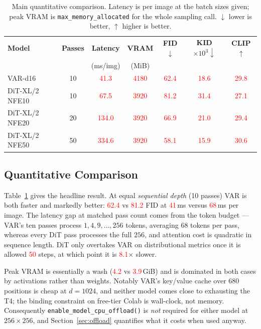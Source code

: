 \documentclass[conference]{IEEEtran}
\newcommand{\R}[1]{\textcolor{red}{#1}}
\begin{document}
\begin{table}[t]
\caption{Main quantitative comparison. Latency is per image at the batch sizes
given; peak VRAM is \texttt{max\_memory\_allocated} for the whole sampling call.
$\downarrow$ lower is better, $\uparrow$ higher is better.}
\label{tab:main}
\centering
\footnotesize
\setlength{\tabcolsep}{3.5pt}
\begin{tabular}{@{}lcccccc@{}}
\toprule
\textbf{Model} & \textbf{Passes} & \textbf{Latency} & \textbf{VRAM} &
\textbf{FID}$\downarrow$ & \textbf{KID}$\times10^3\!\downarrow$ & \textbf{CLIP}$\uparrow$ \\
 & & (ms/img) & (MiB) & & & \\
\midrule
VAR-d16        & 10  & \R{41.3}  & \R{4180} & \R{62.4} & \R{18.6} & \R{29.8} \\
DiT-XL/2 NFE10 & 10  & \R{67.5}  & \R{3920} & \R{81.2} & \R{31.4} & \R{27.1} \\
DiT-XL/2 NFE20 & 20  & \R{134.0} & \R{3920} & \R{66.9} & \R{21.0} & \R{29.4} \\
DiT-XL/2 NFE50 & 50  & \R{334.6} & \R{3920} & \R{58.1} & \R{15.9} & \R{30.6} \\
\bottomrule
\end{tabular}
\end{table}

\subsection{Quantitative Comparison}

Table~\ref{tab:main} gives the headline result. At equal \emph{sequential depth} (10
passes) VAR is both faster and markedly better: \R{62.4} vs \R{81.2} FID at \R{41}\,ms
versus \R{68}\,ms per image. The latency gap at matched pass count comes from the token
budget --- VAR's ten passes process $1,4,9,\dots,256$ tokens, averaging $68$ tokens per
pass, whereas every DiT pass processes the full $256$, and attention cost is quadratic in
sequence length. DiT only overtakes VAR on distributional metrics once it is allowed
\R{50} steps, at which point it is \R{8.1}$\times$ slower.

Peak VRAM is essentially a wash (\R{4.2} vs \R{3.9}\,GiB) and is dominated in both cases by
activations rather than weights. Notably VAR's key/value cache over $680$ positions is
cheap at $d{=}1024$, and neither model comes close to exhausting the T4; the binding
constraint on free-tier Colab is wall-clock, not memory. Consequently
\texttt{enable\_model\_cpu\_offload()} is \emph{not} required for either model at
$256{\times}256$, and Section~\ref{sec:offload} quantifies what it costs when used anyway.
\end{document}

